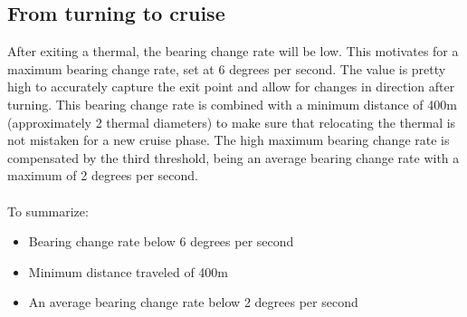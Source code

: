 \subsection{From turning to cruise}
After exiting a thermal, the bearing change rate will be low. This motivates for a maximum bearing change rate, set at 6 degrees per second. The value is pretty high to accurately capture the exit point and allow for changes in direction after turning. This bearing change rate is combined with a minimum distance of 400m (approximately 2 thermal diameters) to make sure that relocating the thermal is not mistaken for a new cruise phase. The high maximum bearing change rate is compensated by the third threshold, being an average bearing change rate with a maximum of 2 degrees per second.\\
\ \\
To summarize:
\begin{itemize}
\item Bearing change rate below 6 degrees per second
\item Minimum distance traveled of 400m
\item An average bearing change rate below 2 degrees per second
\end{itemize}